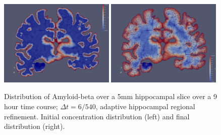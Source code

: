 \begin{figure}	
\includegraphics[width=0.49\textwidth]{./chapters/chp6/FIG/hippocampus_ref3_initialtime.png}
\includegraphics[width=0.49\textwidth]{./chapters/chp6/FIG/hippocampus_ref3_finaltime.png}
\caption{
Distribution of Amyloid-beta over a 5mm hippocampal slice over a 9 hour time course; 
$\Delta t = 6/540$, adaptive hippocampal regional refinement. Initial concentration 
distribution (left) and final distribution (right). 
}
\label{fig:chp6:numerics4}
\end{figure}




